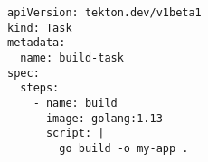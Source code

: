\begin{verbatim}
apiVersion: tekton.dev/v1beta1
kind: Task
metadata:
  name: build-task
spec:
  steps:
    - name: build
      image: golang:1.13
      script: |
        go build -o my-app .
\end{verbatim}